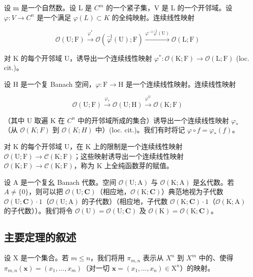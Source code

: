 设 m 是一个自然数。设 L 是 \(C^{m}\) 的一个紧子集，V 是 L 的一个开邻域。设 \(\varphi\colon V \to C^{n}\) 是一个满足 \(\varphi(L) \subset K\) 的全纯映射。连续线性映射

\[
\mathcal {O} (\mathrm{U}; \mathrm{F}) \xrightarrow {\varphi^ {*}} \mathcal {O} (\stackrel {- 1} {\varphi} (\mathrm{U}); \mathrm{F}) \xrightarrow {\varphi^ {- 1} \stackrel {- 1} {\varphi} (\mathrm{U})} \mathcal {O} (\mathrm{L}; \mathrm{F})
\]

对 K 的每个开邻域 U，诱导出一个连续线性映射 \(\varphi^{*}\colon\mathcal{O}(\mathrm{K};\mathrm{F})\to\mathcal{O}(\mathrm{L};\mathrm{F})\) (loc. cit.)。

设 H 是一个复 Banach 空间，\(\varphi\colon\mathrm{F}\to\mathrm{H}\) 是一个连续线性映射。连续线性映射

\[
\mathcal {O} (\mathrm{U}; \mathrm{F}) \xrightarrow {\varphi_ {*}} \mathcal {O} (\mathrm{U}; \mathrm{H}) \xrightarrow {\varphi^ {\mathrm{U}}} \mathcal {O} (\mathrm{K}; \mathrm{F})
\]

（其中 U 取遍 K 在 \(C^{n}\) 中的开邻域所成的集合）诱导出一个连续线性映射 \(\varphi_{*}\)（从 \(\mathcal{O}(K;F)\) 到 \(\mathcal{O}(K;H)\) 中）(loc. cit.)。我们有时将记 \(\varphi \circ f = \varphi_{*}(f)\)。

对 K 的每个开邻域 U，在 K 上的限制是一个连续线性映射 \(\mathcal{O}(\mathrm{U};\mathrm{F})\to \mathcal{C}(\mathrm{K};\mathrm{F})\)；这些映射诱导出一个连续线性映射 \(\mathcal{O}(\mathrm{K};\mathrm{F})\to \mathcal{C}(\mathrm{K};\mathrm{F})\)，称为 K 上全纯函数芽的赋值。

设 A 是一个复幺 Banach 代数。空间 \(\mathcal{O}(\mathrm{U};\mathrm{A})\) 与 \(\mathcal{O}(\mathrm{K};\mathrm{A})\) 是幺代数。若 \(A \neq \{0\}\)，则可以把 \(\mathcal{O}(\mathrm{U};\mathbf{C})\)（相应地，\(\mathcal{O}(\mathrm{K};\mathbf{C})\)）典范地视为子代数 \(\mathcal{O}(\mathrm{U};\mathbf{C}) \cdot 1\)（\(\mathcal{O}(\mathrm{U};\mathrm{A})\) 的子代数）（相应地，子代数 \(\mathcal{O}(\mathrm{K};\mathbf{C}) \cdot 1\)（\(\mathcal{O}(\mathrm{K};\mathrm{A})\) 的子代数））。我们将令 \(\mathcal{O}(\mathrm{U}) = \mathcal{O}(\mathrm{U};\mathbf{C})\) 及 \(\mathcal{O}(\mathrm{K}) = \mathcal{O}(\mathrm{K};\mathbf{C})\)。

\subsection{主要定理的叙述}

设 X 是一个集合。若 \(m \leqslant n\)，我们将用 \(\pi_{m,n}\) 表示从 \(X^{n}\) 到 \(X^{m}\) 中的、使得 \(\pi_{m,n}(\boldsymbol{x}) = (x_{1}, \ldots, x_{m})\)（对一切 \(\boldsymbol{x} = (x_{1}, \ldots, x_{n}) \in \mathrm{X}^{n}\)）的映射。

